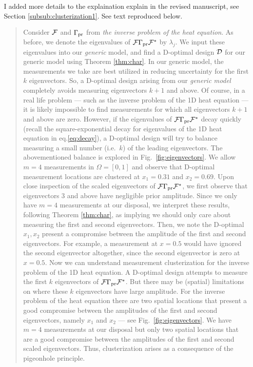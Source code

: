 \AR I added more details to the explaination explain in the revised
manuscript, see Section \ref{subsub:clusterization1}. See text
reproduced below.
\begin{quote}
Consider $\mathcal{F}$ and $\Gamma_{\textup{pr}}$ from \emph{the inverse problem of the
heat equation}. As before, we denote the eigenvalues of
$\mathcal{F}\Gamma_{\textup{pr}}\mathcal{F}^*$ by $\lambda_j$. We input these eigenvalues into our
\emph{generic} model, and find a D-optimal design $\mathcal{D}$ for our
generic model using Theorem \ref{thm:char}. In our generic model, the
measurements we take are best utilized in reducing uncertainty for the
first $k$ eigenvectors. So, a D-optimal design arising from our
\emph{generic model} completely avoids measuring eigenvectors $k+1$
and above.
\newline \newline
Of course, in a real life problem --- such as the inverse problem of
the 1D heat equation --- it is likely impossible to find measurements
for which all eigenvectors $k+1$ and above are zero. However, if the
eigenvalues of $\mathcal{F}\Gamma_{\textup{pr}}\mathcal{F}^*$ decay quickly (recall the
square-exponential decay for eigenvalues of the 1D heat equation in
eq.\eqref{eq:decay}), a D-optimal design will try to balance measuring
a small number (i.e.~$k$) of the leading eigenvectors.
\newline \newline
The abovementioned balance is explored in
Fig.~\ref{fig:eigenvectors}. We allow $m=4$ measurements in $\Omega =
[0,1]$ and observe that D-optimal measurement locations are clustered
at $x_1 = 0.31$ and $x_2 = 0.69$. Upon close inspection of the scaled
eigenvectors of $\mathcal{F} \Gamma_{\textup{pr}} \mathcal{F}^*$, we first observe that
eigenvectors $3$ and above have negligible prior amplitude. Since we
only have $m=4$ measurements at our disposal, we interpret these
results, following Theorem \ref{thm:char}, as implying we should only
care about measuring the first and second eigenvectors. Then, we note
the D-optimal $x_1,x_2$ present a compromise between the amplitude of
the first and second eigenvectors. For example, a measurement at
$x=0.5$ would have ignored the second eigenvector altogether, since
the second eigenvector is zero at $x=0.5$.
\newline \newline
Now we can understand measurement clusterization for the inverse
problem of the 1D heat equation. A D-optimal design attempts to
measure the first $k$ eigenvectors of $\mathcal{F} \Gamma_{\textup{pr}} \mathcal{F}^*$. But there
may be (spatial) limitations on where these $k$ eigenvectors have
large amplitude. For the inverse problem of the heat equation there
are two spatial locations that present a good compromise between the
amplitudes of the first and second eigenvectors, namely $x_1$ and
$x_2$ --- see Fig.~\ref{fig:eigenvectors}. We have $m=4$ measurements
at our disposal but only two spatial locations that are a good
compromise between the amplitudes of the first and second scaled
eigenvectors. Thus, clusterization arises as a consequence of the
pigeonhole principle.
\end{quote}
